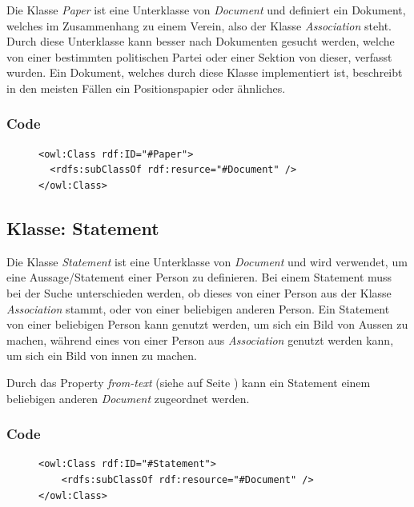 \documentclass[
    11pt,
    latin1,
    a4paper,
    oneside
]{scrreprt}
\begin{document}
Die Klasse \emph{Paper} ist eine Unterklasse von \emph{Document} und definiert ein Dokument, welches im Zusammenhang zu einem Verein, also der Klasse \emph{Association} steht. Durch diese Unterklasse kann besser nach Dokumenten gesucht werden, welche von einer bestimmten politischen Partei oder einer Sektion von dieser, verfasst wurden. Ein Dokument, welches durch diese Klasse implementiert ist, beschreibt in den meisten F\"allen ein Positionspapier oder \"ahnliches.

\subsubsection{Code} \label{sec:class_paper_code}

\begin{figure}[H]
 \lstset{language=XML}
 \begin{lstlisting}[label=owl:paper,caption={Die Klasse \emph{Paper} ist ein Dokument einer \emph{Association}, also eines partei/Gesellschaft}]
<owl:Class rdf:ID="#Paper">
  <rdfs:subClassOf rdf:resurce="#Document" />
</owl:Class>
 \end{lstlisting}
\end{figure}


\subsection{Klasse: Statement} \label{sec:class_statement}

Die Klasse \emph{Statement} ist eine Unterklasse von \emph{Document} und wird verwendet, um eine Aussage/Statement einer Person zu definieren. Bei einem Statement muss bei der Suche unterschieden werden, ob dieses von einer Person aus der Klasse \emph{Association} stammt, oder von einer beliebigen anderen Person. Ein Statement von einer beliebigen Person kann genutzt werden, um sich ein Bild von Aussen zu machen, w\"ahrend eines von einer Person aus \emph{Association} genutzt werden kann, um sich ein Bild von innen zu machen.

Durch das Property \emph{from-text} (siehe  auf Seite \pageref{sec:res_fromtext}) kann ein Statement einem beliebigen anderen \emph{Document} zugeordnet werden.

\subsubsection{Code} \label{sec:class_statement_code}

\begin{figure}[H]
 \lstset{language=XML}
 \begin{lstlisting}[label=owl:statement,caption={Ein \emph{Statement} beschreibt eine Aussage einer Person}]
<owl:Class rdf:ID="#Statement">
    <rdfs:subClassOf rdf:resource="#Document" />
</owl:Class>
 \end{lstlisting}
\end{figure}
\end{document}
